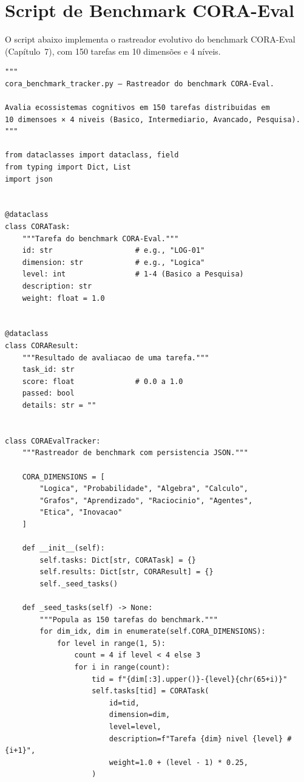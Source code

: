 \section{Script de Benchmark CORA-Eval}
\label{sec:cod-cora}

O script abaixo implementa o rastreador evolutivo do benchmark CORA-Eval
(Capítulo~7), com 150 tarefas em 10 dimensões e 4 níveis.

\begin{lstlisting}[caption={CORA-Eval benchmark tracker},
                   label={cod:cora}, style=pythonstyle]
"""
cora_benchmark_tracker.py — Rastreador do benchmark CORA-Eval.

Avalia ecossistemas cognitivos em 150 tarefas distribuidas em
10 dimensoes × 4 niveis (Basico, Intermediario, Avancado, Pesquisa).
"""

from dataclasses import dataclass, field
from typing import Dict, List
import json


@dataclass
class CORATask:
    """Tarefa do benchmark CORA-Eval."""
    id: str                   # e.g., "LOG-01"
    dimension: str            # e.g., "Logica"
    level: int                # 1-4 (Basico a Pesquisa)
    description: str
    weight: float = 1.0


@dataclass
class CORAResult:
    """Resultado de avaliacao de uma tarefa."""
    task_id: str
    score: float              # 0.0 a 1.0
    passed: bool
    details: str = ""


class CORAEvalTracker:
    """Rastreador de benchmark com persistencia JSON."""

    CORA_DIMENSIONS = [
        "Logica", "Probabilidade", "Algebra", "Calculo",
        "Grafos", "Aprendizado", "Raciocinio", "Agentes",
        "Etica", "Inovacao"
    ]

    def __init__(self):
        self.tasks: Dict[str, CORATask] = {}
        self.results: Dict[str, CORAResult] = {}
        self._seed_tasks()

    def _seed_tasks(self) -> None:
        """Popula as 150 tarefas do benchmark."""
        for dim_idx, dim in enumerate(self.CORA_DIMENSIONS):
            for level in range(1, 5):
                count = 4 if level < 4 else 3
                for i in range(count):
                    tid = f"{dim[:3].upper()}-{level}{chr(65+i)}"
                    self.tasks[tid] = CORATask(
                        id=tid,
                        dimension=dim,
                        level=level,
                        description=f"Tarefa {dim} nivel {level} #{i+1}",
                        weight=1.0 + (level - 1) * 0.25,
                    )


\end{lstlisting}
